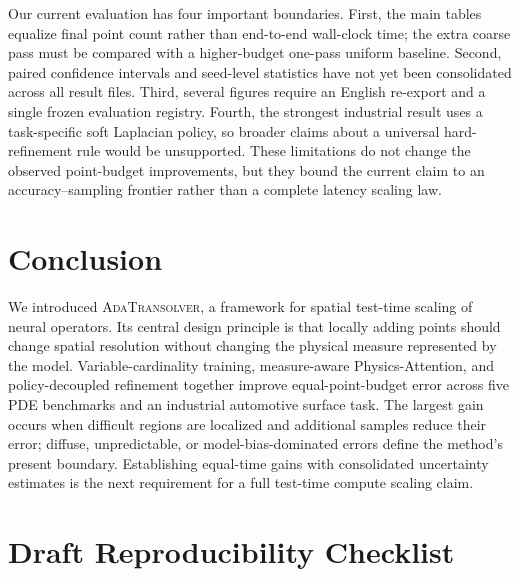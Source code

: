 \documentclass{article}
\newcommand{\method}{\textsc{AdaTransolver}}
\begin{document}
Our current evaluation has four important boundaries. First, the main tables
equalize final point count rather than end-to-end wall-clock time; the extra
coarse pass must be compared with a higher-budget one-pass uniform baseline.
Second, paired confidence intervals and seed-level statistics have not yet been
consolidated across all result files. Third, several figures require an English
re-export and a single frozen evaluation registry. Fourth, the strongest
industrial result uses a task-specific soft Laplacian policy, so broader claims
about a universal hard-refinement rule would be unsupported. These limitations
do not change the observed point-budget improvements, but they bound the current
claim to an accuracy--sampling frontier rather than a complete latency scaling
law.

\section{Conclusion}

We introduced \method, a framework for spatial test-time scaling of neural
operators. Its central design principle is that locally adding points should
change spatial resolution without changing the physical measure represented by
the model. Variable-cardinality training, measure-aware Physics-Attention, and
policy-decoupled refinement together improve equal-point-budget error across
five PDE benchmarks and an industrial automotive surface task. The largest gain
occurs when difficult regions are localized and additional samples reduce their
error; diffuse, unpredictable, or model-bias-dominated errors define the method's
present boundary. Establishing equal-time gains with consolidated uncertainty
estimates is the next requirement for a full test-time compute scaling claim.




\appendix

\section{Draft Reproducibility Checklist}
\end{document}
